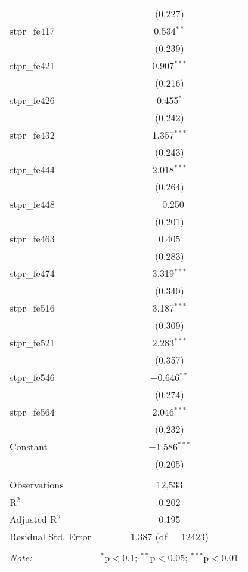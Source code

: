 \begin{table}[!htbp]
\begin{tabular}{@{\extracolsep{5pt}}lc}
  & (0.227) \\ 
  stpr\_fe417 & 0.534$^{**}$ \\ 
  & (0.239) \\ 
  stpr\_fe421 & 0.907$^{***}$ \\ 
  & (0.216) \\ 
  stpr\_fe426 & 0.455$^{*}$ \\ 
  & (0.242) \\ 
  stpr\_fe432 & 1.357$^{***}$ \\ 
  & (0.243) \\ 
  stpr\_fe444 & 2.018$^{***}$ \\ 
  & (0.264) \\ 
  stpr\_fe448 & $-$0.250 \\ 
  & (0.201) \\ 
  stpr\_fe463 & 0.405 \\ 
  & (0.283) \\ 
  stpr\_fe474 & 3.319$^{***}$ \\ 
  & (0.340) \\ 
  stpr\_fe516 & 3.187$^{***}$ \\ 
  & (0.309) \\ 
  stpr\_fe521 & 2.283$^{***}$ \\ 
  & (0.357) \\ 
  stpr\_fe546 & $-$0.646$^{**}$ \\ 
  & (0.274) \\ 
  stpr\_fe564 & 2.046$^{***}$ \\ 
  & (0.232) \\ 
  Constant & $-$1.586$^{***}$ \\ 
  & (0.205) \\ 
 \hline \\[-1.8ex] 
Observations & 12,533 \\ 
R$^{2}$ & 0.202 \\ 
Adjusted R$^{2}$ & 0.195 \\ 
Residual Std. Error & 1.387 (df = 12423) \\ 
\hline 
\hline \\[-1.8ex] 
\textit{Note:}  & \multicolumn{1}{r}{$^{*}$p$<$0.1; $^{**}$p$<$0.05; $^{***}$p$<$0.01} \\ 
\end{tabular} 
\end{table} 
